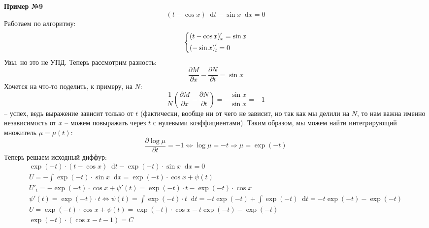 \documentclass[a4paper,12pt]{article}
\renewcommand*\d{\mathop{}\!\mathrm{d}}
\newcommand{\ds}{\displaystyle}
\begin{document}
\textbf{Пример №9}
\[(t - \cos x)\d t - \sin x\d x = 0\]
Работаем по алгоритму:
\[\left\{\begin{gathered}
(t - \cos x)'_x = \sin x\hfill\\
\left(- \sin x\right)'_t = 0\hfill
\end{gathered}\right.\]
Увы, но это не УПД. Теперь рассмотрим разность:
\[\dfrac{\partial M}{\partial x} - \dfrac{\partial N}{\partial t} = \sin x\]
Хочется на что-то поделить, к примеру, на $N$:
\[\dfrac{1}{N}\left(\dfrac{\partial M}{\partial x} - \dfrac{\partial N}{\partial t}\right) = -\dfrac{\sin x}{\sin x} = -1\] -- успех, ведь выражение зависит только от $t$ (фактически, вообще ни от чего не зависит, но так как мы делили на $N$, то нам важна именно независимость от $x$ -- можем повыражать через $t$ с нулевыми коэффициентами). Таким образом, мы можем найти интегрирующий множитель $\mu = \mu(t)$:
\[\dfrac{\partial \log\mu}{\partial t} = -1 \iff \log\mu = -t \Longrightarrow \mu = \exp(-t)\]
Теперь решаем исходный диффур:
\begin{gather*}
\exp(-t)\cdot (t - \cos x)\d t - \exp( -t)\cdot \sin x\d x = 0\\
U = -\ds\int \exp( -t)\cdot \sin x\d x = \exp(-t)\cdot \cos x + \psi(t)\\
U'_t = -\exp(-t)\cdot \cos x + \psi'(t) = \exp(-t)\cdot t - \exp(-t)\cdot\cos x\\
\psi'(t) = \exp(-t)\cdot t \iff \psi(t) = \ds\int \exp(-t)\cdot t \d t = -t\exp(-t) + \ds\int\exp(-t)\d t = -t\exp(-t) - \exp(-t)\\
U = \exp(-t)\cdot \cos x + \psi(t) = \exp(-t)\cdot \cos x - t\exp(-t) - \exp(-t)\\
\exp(-t)\cdot (\cos x - t - 1) = C
\end{gather*}
\end{document}
